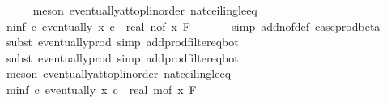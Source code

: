 \begin{isabellebody}
\ \ \ \ \isamarkupfalse%
\ {\isacharparenleft}{\kern0pt}meson\ eventually{\isacharunderscore}{\kern0pt}at{\isacharunderscore}{\kern0pt}top{\isacharunderscore}{\kern0pt}linorder\ nat{\isacharunderscore}{\kern0pt}ceiling{\isacharunderscore}{\kern0pt}le{\isacharunderscore}{\kern0pt}eq{\isacharparenright}{\kern0pt}\isanewline
\isanewline
\ \ \isamarkupfalse%
\ n{\isacharunderscore}{\kern0pt}inf{\isacharcolon}{\kern0pt}\ {\isachardoublequoteopen}{\isasymAnd}c{\isachardot}{\kern0pt}\ eventually\ {\isacharparenleft}{\kern0pt}{\isasymlambda}x{\isachardot}{\kern0pt}\ c\ {\isasymle}\ {\isacharparenleft}{\kern0pt}real\ {\isacharparenleft}{\kern0pt}n{\isacharunderscore}{\kern0pt}of\ x{\isacharparenright}{\kern0pt}{\isacharparenright}{\kern0pt}{\isacharparenright}{\kern0pt}\ {\isacharquery}{\kern0pt}F{\isachardoublequoteclose}\ \isanewline
\ \ \ \ \isamarkupfalse%
\ {\isacharparenleft}{\kern0pt}simp\ add{\isacharcolon}{\kern0pt}n{\isacharunderscore}{\kern0pt}of{\isacharunderscore}{\kern0pt}def\ case{\isacharunderscore}{\kern0pt}prod{\isacharunderscore}{\kern0pt}beta{\isacharprime}{\kern0pt}{\isacharparenright}{\kern0pt}\isanewline
\ \ \ \ \isamarkupfalse%
\ {\isacharparenleft}{\kern0pt}subst\ eventually{\isacharunderscore}{\kern0pt}prod{}{\isacharprime}{\kern0pt}{\isacharcomma}{\kern0pt}\ simp\ add{\isacharcolon}{\kern0pt}prod{\isacharunderscore}{\kern0pt}filter{\isacharunderscore}{\kern0pt}eq{\isacharunderscore}{\kern0pt}bot{\isacharparenright}{\kern0pt}\isanewline
\ \ \ \ \isamarkupfalse%
\ {\isacharparenleft}{\kern0pt}subst\ eventually{\isacharunderscore}{\kern0pt}prod{}{\isacharprime}{\kern0pt}{\isacharcomma}{\kern0pt}\ simp\ add{\isacharcolon}{\kern0pt}prod{\isacharunderscore}{\kern0pt}filter{\isacharunderscore}{\kern0pt}eq{\isacharunderscore}{\kern0pt}bot{\isacharparenright}{\kern0pt}\isanewline
\ \ \ \ \isamarkupfalse%
\ {\isacharparenleft}{\kern0pt}meson\ eventually{\isacharunderscore}{\kern0pt}at{\isacharunderscore}{\kern0pt}top{\isacharunderscore}{\kern0pt}linorder\ nat{\isacharunderscore}{\kern0pt}ceiling{\isacharunderscore}{\kern0pt}le{\isacharunderscore}{\kern0pt}eq{\isacharparenright}{\kern0pt}\isanewline
\isanewline
\ \ \isamarkupfalse%
\ m{\isacharunderscore}{\kern0pt}inf{\isacharcolon}{\kern0pt}\ {\isachardoublequoteopen}{\isasymAnd}c{\isachardot}{\kern0pt}\ eventually\ {\isacharparenleft}{\kern0pt}{\isasymlambda}x{\isachardot}{\kern0pt}\ c\ {\isasymle}\ {\isacharparenleft}{\kern0pt}real\ {\isacharparenleft}{\kern0pt}m{\isacharunderscore}{\kern0pt}of\ x{\isacharparenright}{\kern0pt}{\isacharparenright}{\kern0pt}{\isacharparenright}{\kern0pt}\ {\isacharquery}{\kern0pt}F{\isachardoublequoteclose}\ \isanewline

\end{isabellebody}
